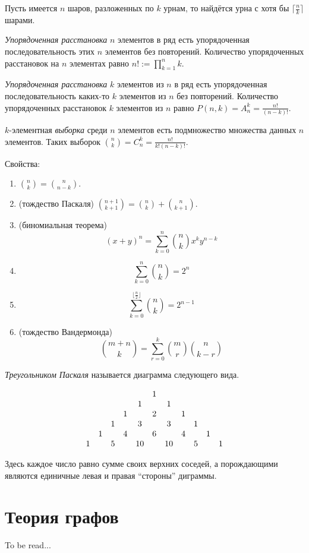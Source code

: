 \documentclass[12pt,a4paper]{article}
\begin{document}
    \begin{statement}
        Пусть имеется $n$ шаров, разложенных по $k$ урнам, то найдётся урна с хотя бы $\lceil\frac{n}{k}\rceil$ шарами.
    \end{statement}

    \begin{definition}
        \emph{Упорядоченная расстановка} $n$ элементов в ряд есть упорядоченная последовательность этих $n$ элементов без повторений. Количество упорядоченных расстановок на $n$ элементах равно $n! := \prod_{k=1}^n k$.
        
        \emph{Упорядоченная расстановка} $k$ элементов из $n$ в ряд есть упорядоченная последовательность каких-то $k$ элементов из $n$ без повторений. Количество упорядоченных расстановок $k$ элементов из $n$ равно $P(n, k) = A_n^k = \frac{n!}{(n-k)!}$.

        $k$-элементная \emph{выборка} среди $n$ элементов есть подмножество множества данных $n$ элементов. Таких выборок $\binom{n}{k}=C_n^k = \frac{n!}{k!(n-k)!}$.
    \end{definition}

    \begin{statement}Свойства:
        \begin{enumerate}
            \item $\binom{n}{k}=\binom{n}{n-k}$.
            \item (тождество Паскаля) $\binom{n+1}{k+1} = \binom{n}{k} + \binom{n}{k+1}$.
            \item (биномиальная теорема) \[(x+y)^n=\sum_{k=0}^n \binom{n}{k} x^k y^{n-k}\]
            \item \[\sum_{k=0}^n \binom{n}{k} = 2^n\]
            \item \[\sum_{k=0}^{\lfloor\frac{n}{2}\rfloor} \binom{n}{k} = 2^{n-1}\]
            \item (тождество Вандермонда) \[\binom{m+n}{k} = \sum_{r=0}^k \binom{m}{r}\binom{n}{k-r}\]
        \end{enumerate}
    \end{statement}

    \begin{definition}
        \emph{Треугольником Паскаля} называется диаграмма следующего вида.

        \[
            \setcounter{MaxMatrixCols}{15}
            \begin{matrix}
                &&&&& 1\\
                &&&& 1 && 1\\
                &&& 1 && 2 && 1\\
                && 1 && 3 && 3 && 1\\
                & 1 && 4 && 6 && 4 && 1\\
                1 && 5 && 10 && 10 && 5 && 1\\
            \end{matrix}
        \]

        Здесь каждое число равно сумме своих верхних соседей, а порождающими являются единичные левая и правая ``стороны'' диграммы.
    \end{definition}

    \section{Теория графов}

    To be read...
\end{document}
